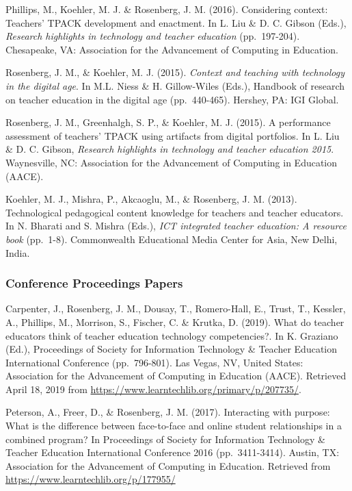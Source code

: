 \documentclass[14,]{article}
\begin{document}
Phillips, M., Koehler, M. J. \& Rosenberg, J. M. (2016). Considering
context: Teachers' TPACK development and enactment. In L. Liu \& D. C.
Gibson (Eds.), \emph{Research highlights in technology and teacher
education} (pp.~197-204). Chesapeake, VA: Association for the
Advancement of Computing in Education.

Rosenberg, J. M., \& Koehler, M. J. (2015). \emph{Context and teaching
with technology in the digital age}. In M.L. Niess \& H. Gillow-Wiles
(Eds.), Handbook of research on teacher education in the digital age
(pp.~440-465). Hershey, PA: IGI Global.

Rosenberg, J. M., Greenhalgh, S. P., \& Koehler, M. J. (2015). A
performance assessment of teachers' TPACK using artifacts from digital
portfolios. In L. Liu \& D. C. Gibson, \emph{Research highlights in
technology and teacher education 2015}. Waynesville, NC: Association for
the Advancement of Computing in Education (AACE).

Koehler, M. J., Mishra, P., Akcaoglu, M., \& Rosenberg, J. M. (2013).
Technological pedagogical content knowledge for teachers and teacher
educators. In N. Bharati and S. Mishra (Eds.), \emph{ICT integrated
teacher education: A resource book} (pp.~1-8). Commonwealth Educational
Media Center for Asia, New Delhi, India.

\hypertarget{conference-proceedings-papers}{%
\subsubsection{Conference Proceedings
Papers}\label{conference-proceedings-papers}}

Carpenter, J., Rosenberg, J. M., Dousay, T., Romero-Hall, E., Trust, T.,
Kessler, A., Phillips, M., Morrison, S., Fischer, C. \& Krutka, D.
(2019). What do teacher educators think of teacher education technology
competencies?. In K. Graziano (Ed.), Proceedings of Society for
Information Technology \& Teacher Education International Conference
(pp.~796-801). Las Vegas, NV, United States: Association for the
Advancement of Computing in Education (AACE). Retrieved April 18, 2019
from \url{https://www.learntechlib.org/primary/p/207735/}.

Peterson, A., Freer, D., \& Rosenberg, J. M. (2017). Interacting with
purpose: What is the difference between face-to-face and online student
relationships in a combined program? In Proceedings of Society for
Information Technology \& Teacher Education International Conference
2016 (pp.~3411-3414). Austin, TX: Association for the Advancement of
Computing in Education. Retrieved from
\url{https://www.learntechlib.org/p/177955/}
\end{document}
